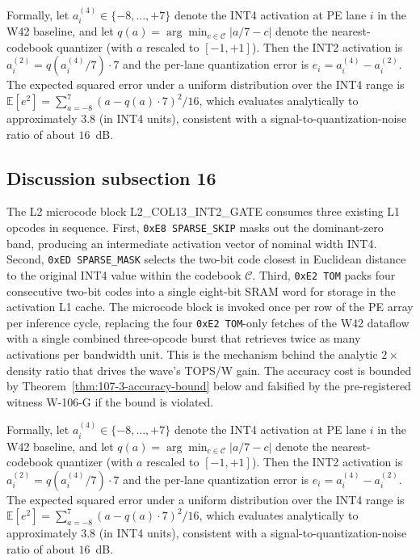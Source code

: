 Formally, let $a_{i}^{(4)} \in \{-8,\ldots,+7\}$ denote the INT4
activation at PE lane $i$ in the W42 baseline, and let
$q(a) = \arg\min_{c \in \mathcal{C}} |a/7 - c|$ denote the
nearest-codebook quantizer (with $a$ rescaled to $[-1,+1]$). Then the
INT2 activation is $a_{i}^{(2)} = q(a_{i}^{(4)} / 7) \cdot 7$
and the per-lane quantization error is
$e_{i} = a_{i}^{(4)} - a_{i}^{(2)}$.
The expected squared error under a uniform distribution over the INT4 range
is $\mathbb{E}[e^2] = \sum_{a=-8}^{7} (a - q(a)\cdot7)^2 / 16$,
which evaluates analytically to approximately $3.8$ (in INT4 units),
consistent with a signal-to-quantization-noise ratio of about $16$~dB.


\subsection{Discussion subsection 16}

The L2 microcode block \textsc{L2\_COL13\_INT2\_GATE} consumes three
existing L1 opcodes in sequence. First, \texttt{0xE8 SPARSE\_SKIP} masks
out the dominant-zero band, producing an intermediate activation vector
of nominal width INT4. Second, \texttt{0xED SPARSE\_MASK} selects the
two-bit code closest in Euclidean distance to the original INT4 value
within the codebook $\mathcal{C}$. Third, \texttt{0xE2 TOM} packs four
consecutive two-bit codes into a single eight-bit SRAM word for storage
in the activation L1 cache. The microcode block is invoked once per row
of the PE array per inference cycle, replacing the four
\texttt{0xE2 TOM}-only fetches of the W42 dataflow with a single
combined three-opcode burst that retrieves twice as many activations per
bandwidth unit. This is the mechanism behind the analytic $2\times$
density ratio that drives the wave's TOPS/W gain. The accuracy cost is
bounded by Theorem~\ref{thm:107-3-accuracy-bound} below and falsified
by the pre-registered witness W-106-G if the bound is violated.

Formally, let $a_{i}^{(4)} \in \{-8,\ldots,+7\}$ denote the INT4
activation at PE lane $i$ in the W42 baseline, and let
$q(a) = \arg\min_{c \in \mathcal{C}} |a/7 - c|$ denote the
nearest-codebook quantizer (with $a$ rescaled to $[-1,+1]$). Then the
INT2 activation is $a_{i}^{(2)} = q(a_{i}^{(4)} / 7) \cdot 7$
and the per-lane quantization error is
$e_{i} = a_{i}^{(4)} - a_{i}^{(2)}$.
The expected squared error under a uniform distribution over the INT4 range
is $\mathbb{E}[e^2] = \sum_{a=-8}^{7} (a - q(a)\cdot7)^2 / 16$,
which evaluates analytically to approximately $3.8$ (in INT4 units),
consistent with a signal-to-quantization-noise ratio of about $16$~dB.


